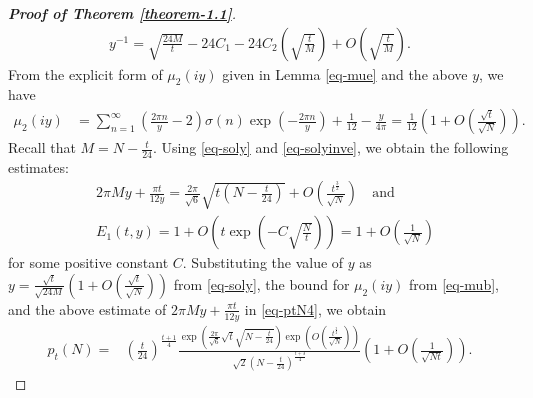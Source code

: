 \documentclass[11pt]{amsart}
\theoremstyle{plain}
\numberwithin{equation}{section}
\begin{document}
\begin{proof}[\textbf{\boldmath Proof of Theorem \ref{theorem-1.1}}]
		\begin{align}\label{eq-solyinve}
			y^{-1}=\sqrt{\frac{24M}{t}}-24 C_1-24C_2\left(\sqrt{\frac{t}{M}}\right)+O\left(\sqrt{\frac{t}{M}}\right).    
		\end{align}
		From the explicit form of $\mu_2(iy)$ given in Lemma \ref{eq-mue} and the above $y$, we have
		\begin{align}\label{eq-mub}
			\mu_2(iy)&= \sum_{n=1}^{\infty}\left(\frac{2\pi n}{y}-2\right) \sigma(n)\exp\left(-\frac{2\pi n}{y}\right)+\frac{1}{12}-\frac{y}{4\pi}=\frac{1}{12}\left(1+O\left(\frac{\sqrt{t}}{\sqrt{N}}\right)\right).
		\end{align}
		Recall that $M=N-\frac{t}{24}$.
		Using \eqref{eq-soly} and \eqref{eq-solyinve}, we obtain the following estimates:
		\begin{align*}
			&2\pi My+\frac{\pi t}{12y}= \frac{2\pi}{\sqrt{6}}\sqrt{t\left(N-\frac{t}{24}\right)}+O\left(\frac{t^{\frac{3}{2}}}{\sqrt{N}}\right) \quad\text{and}\\
			&E_1(t,y)=1+O\left(t\exp\left(-C\sqrt{\frac{N}{t}}\right)\right)=1+O\left(\frac{1}{\sqrt{N}}\right)
		\end{align*}
		for some positive constant $C$.
		\newline
		Substituting the value of $y$ as $y=\frac{\sqrt{t}}{\sqrt{24M}}\left(1+O\left(\frac{\sqrt{t}}{\sqrt{N}}\right)\right)$ from \eqref{eq-soly}, the bound for $\mu_2(iy)$ from \eqref{eq-mub}, and the above estimate of $2\pi My +\frac{\pi t}{12y}$ in 
		\eqref{eq-ptN4}, we obtain
		\begin{align*}
			p_t(N)=&\left(\frac{t}{24}\right)^{\frac{t+1}{4}}\frac{\exp\left(\frac{2\pi}{\sqrt{6}}\sqrt{t}\sqrt{N-\frac{t}{24}}\right)\exp\left(O\left(\frac{t^{\frac{3}{2}}}{\sqrt{N}}\right)\right)}{\sqrt{2}\left(N-\frac{t}{24}\right)^{\frac{t+3}{4}}}\left(1 + O\left(\frac{1}{\sqrt{Nt}}\right)\right).   
		\end{align*}
	\end{proof}
\end{document}
